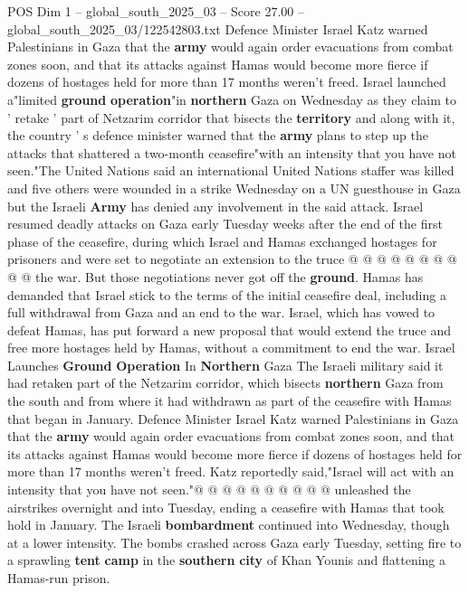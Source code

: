 \begin{textsample}{POS Dim 1 – global\_south\_2025\_03 – Score 27.00 – global\_south\_2025\_03/122542803.txt}  \label{ex:f1_pos_265}
Defence Minister Israel Katz warned Palestinians in Gaza that the \textbf{army} would again order evacuations from combat zones soon, and that its attacks against Hamas would become more fierce if dozens of hostages held for more than 17 months weren't freed.
Israel launched a"limited \textbf{ground} \textbf{operation}"in \textbf{northern} Gaza on Wednesday as they claim to ' retake ' part of Netzarim corridor that bisects the \textbf{territory} and along with it, the country ' s defence minister warned that the \textbf{army} plans to step up the attacks that shattered a two-month ceasefire"with an intensity that you have not seen."The United Nations said an international United Nations staffer was killed and five others were wounded in a strike Wednesday on a UN guesthouse in Gaza but the Israeli \textbf{Army} has denied any involvement in the said attack.
Israel resumed deadly attacks on Gaza early Tuesday weeks after the end of the first phase of the ceasefire, during which Israel and Hamas exchanged hostages for prisoners and were set to negotiate an extension to the truce @ @ @ @ @ @ @ @ @ @ the war.
But those negotiations never got off the \textbf{ground}.
Hamas has demanded that Israel stick to the terms of the initial ceasefire deal, including a full withdrawal from Gaza and an end to the war.
Israel, which has vowed to defeat Hamas, has put forward a new proposal that would extend the truce and free more hostages held by Hamas, without a commitment to end the war.
Israel Launches \textbf{Ground} \textbf{Operation} In \textbf{Northern} Gaza The Israeli military said it had retaken part of the Netzarim corridor, which bisects \textbf{northern} Gaza from the south and from where it had withdrawn as part of the ceasefire with Hamas that began in January.
Defence Minister Israel Katz warned Palestinians in Gaza that the \textbf{army} would again order evacuations from combat zones soon, and that its attacks against Hamas would become more fierce if dozens of hostages held for more than 17 months weren't freed.
Katz reportedly said,"Israel will act with an intensity that you have not seen."@ @ @ @ @ @ @ @ @ @ unleashed the airstrikes overnight and into Tuesday, ending a ceasefire with Hamas that took hold in January.
The Israeli \textbf{bombardment} continued into Wednesday, though at a lower intensity.
The bombs crashed across Gaza early Tuesday, setting fire to a sprawling \textbf{tent} \textbf{camp} in the \textbf{southern} \textbf{city} of Khan Younis and flattening a Hamas-run prison.

\end{textsample}
